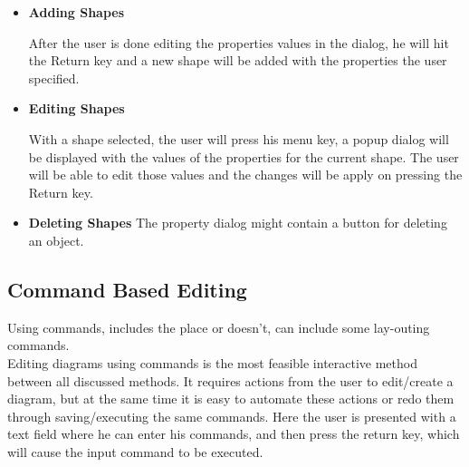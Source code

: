 \begin{itemize}
\begin{itemize}
	\item {\bf Adding Shapes}
	\par \noindent
	After the user is done editing the properties values in the dialog, he will hit the Return key and a new shape will be added with the properties the user specified.

	\item {\bf Editing Shapes}
	\par \noindent
	With a shape selected, the user will press his menu key, a popup dialog will be displayed with the values of the properties for the current shape. The user will be able to edit those values and the changes will be apply on pressing the Return key.

	\item {\bf Deleting Shapes}
	The property dialog might contain a button for deleting an object.

	\end{itemize}

\end{itemize}

\subsection{Command Based Editing}
\par \noindent
Using commands, includes the place or doesn't, can include some lay-outing commands.\\
Editing diagrams using commands is the most feasible interactive method between all discussed methods. It requires actions from the user to edit/create a diagram, but at the same time it is easy to automate these actions or redo them through saving/executing the same commands. Here the user is presented with a text field where he can enter his commands, and then press the return key, which will cause the input command to be executed.

